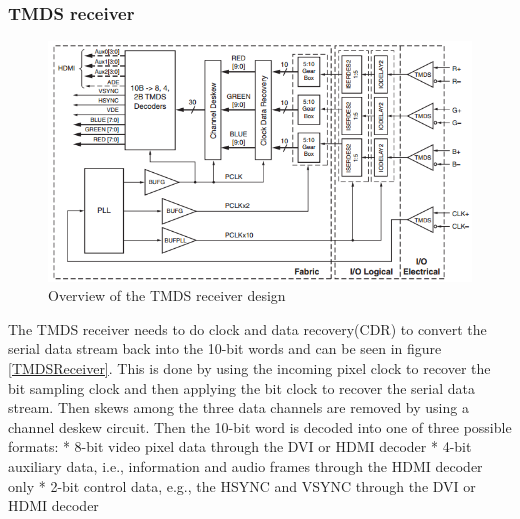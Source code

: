 \subsubsection{TMDS receiver}
\begin{figure}
    \includegraphics{img/TMDSreceiverdesign.png}
    \caption{Overview of the TMDS receiver design}
    \label{fig:TMDSReceiver}
\end{figure}
The TMDS receiver needs to do clock and data recovery(CDR) to convert the serial data stream back into the 10-bit words and can be seen in figure \ref{TMDSReceiver}. This is done by using the incoming pixel clock to recover the bit sampling clock and then applying the bit clock to recover the serial data stream. Then skews among the three data channels are removed by using a channel deskew circuit. Then the 10-bit word is decoded into one of three possible formats:
* 8-bit video pixel data through the DVI or HDMI decoder
* 4-bit auxiliary data, i.e., information and audio frames through the HDMI decoder only
* 2-bit control data, e.g., the HSYNC and VSYNC through the DVI or HDMI decoder
